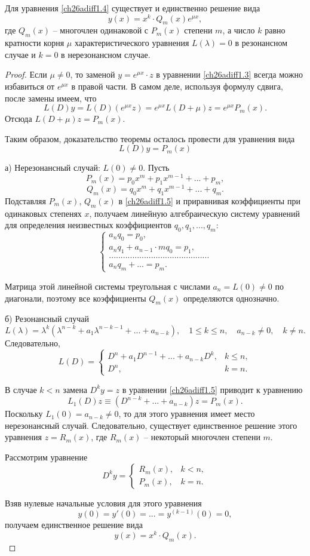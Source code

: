 \begin{thm} 
Для уравнения \eqref{ch26adiff1.4} существует и единственно решение вида
$$
y(x)=x^k\cdot Q_m(x)e^{\mu x},
$$
где $Q_m(x)$ -- многочлен одинаковой с $P_m(x)$ степени $m$, а число $k$ равно кратности корня $\mu$ характеристического уравнения $L(\lambda)=0$ в резонансном случае и $k=0$ в нерезонансном случае.
\end{thm}

\begin{proof}
Если $\mu\neq 0$, то заменой $y=e^{\mu x}\cdot z$ в уравнении \eqref{ch26adiff1.3} всегда можно избавиться от $e^{\mu x}$ в правой части. В самом деле,  используя формулу сдвига, после замены имеем, что
$$
L(D)y=L(D)(e^{\mu x}z)=e^{\mu x}L(D+\mu)z=e^{\mu x}P_m(x).
$$
Отсюда $L(D+\mu)z=P_m(x)$.

Таким образом, доказательство теоремы осталось провести для уравнения вида
\begin{equation}\label{ch26adiff1.5}
L(D)y=P_m(x)
\end{equation}

а) Нерезонансный случай: $L(0)\neq 0$. Пусть
$$
P_m(x)=p_0x^m+p_1x^{m-1}+...+p_m,
$$
$$
Q_m(x)=q_0x^m+q_1x^{m-1}+...+q_m.
$$
Подставляя $P_m(x)$, $Q_m(x)$ в \eqref{ch26adiff1.5} и приравнивая коэффициенты при одинаковых степенях $x$, получаем линейную алгебраическую систему уравнений для  определения неизвестных коэффициентов $q_0,q_1,...,q_m$:
$$
\begin{cases}
a_nq_0=p_0,\\
a_nq_1+a_{n-1}\cdot m q_0=p_1,\\
...........................................\\
a_nq_m+...=p_m.
\end{cases}
$$

Матрица этой линейной системы треугольная с числами $a_n=L(0)\neq 0$ по диагонали, поэтому все коэффициенты $Q_m(x)$ определяются однозначно.

б) Резонансный случай
$$
L(\lambda)=\lambda^k(\lambda^{n-k}+a_1\lambda^{n-k-1}+...+a_{n-k}),\quad 1\leq k \leq n,\quad a_{n-k}\neq 0,\quad k\neq n.
$$
Следовательно,
$$
L(D)=\begin{cases}
D^n+a_1D^{n-1}+...+a_{n-k}D^k, &k\le n,\\
D^n, &k=n.
\end{cases}
$$

В случае $k<n$ замена $D^ky=z$ в уравнении \eqref{ch26adiff1.5} приводит к уравнению
$$
L_1(D)z\equiv (D^{n-k}+...+a_{n-k})z=P_m(x).
$$
Поскольку $L_1(0)=a_{n-k}\neq 0$, то для этого уравнения имеет место нерезонансный случай. Следовательно, существует единственное решение этого уравнения $z=R_m(x)$, где $R_m(x)$ -- некоторый многочлен степени $m$.


Рассмотрим уравнение
$$
D^ky=\begin{cases}
R_m(x), &k<n,\\
P_m(x), &k=n.
\end{cases}
$$

Взяв нулевые начальные условия для этого уравнения
$$
y(0)=y'(0)=...=y^{(k-1)}(0)=0,
$$
получаем единственное решение вида
\begin{equation}
y(x)=x^k\cdot Q_m(x).\tag*{\qedhere}
\end{equation}
\end{proof}
